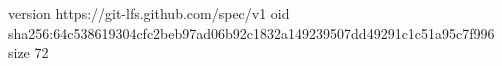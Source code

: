 version https://git-lfs.github.com/spec/v1
oid sha256:64c538619304cfc2beb97ad06b92c1832a149239507dd49291c1c51a95c7f996
size 72
